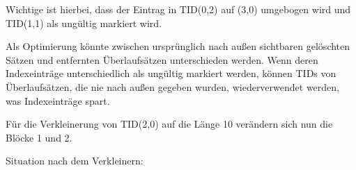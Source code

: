 \begin{enumerate}[a)]
\begin{note}
\begin{center}
		\end{center}

		Wichtige ist hierbei, dass der Eintrag in TID(0,2) auf (3,0) umgebogen wird und TID(1,1) als ungültig markiert wird.

		Als Optimierung könnte zwischen ursprünglich nach außen sichtbaren gelöschten Sätzen und entfernten Überlaufsätzen unterschieden werden.
		Wenn deren Indexeinträge unterschiedlich als ungültig markiert werden, können TIDs von Überlaufsätzen, die nie nach außen gegeben wurden, wiederverwendet werden, was Indexeinträge spart.

		Für die Verkleinerung von TID(2,0) auf die Länge 10 verändern sich nun die Blöcke 1 und 2.

		Situation nach dem Verkleinern:

		\begin{center}
		\end{center}
	\end{note}
\end{enumerate}

